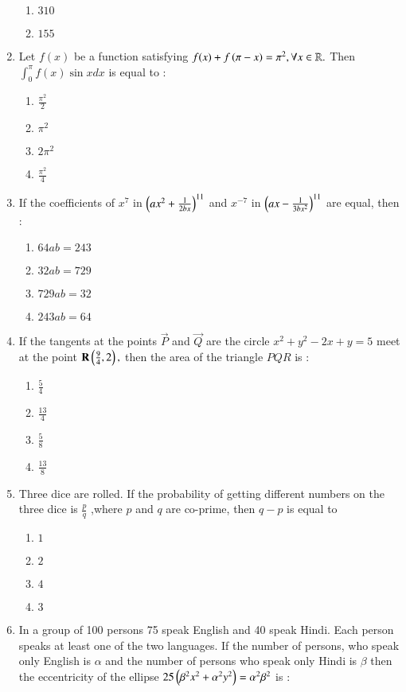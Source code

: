 \documentclass[journal,12pt,onecolumn]{IEEEtran}
\theoremstyle{remark}
\begin{document}
\begin{enumerate}
\begin{enumerate}
        \item $310$     
        \item $155$     
    \end{enumerate}
\item Let $f(x)$ be a function satisfying $f(x)+f\left(\pi -x\right)=\pi ^2,\forall x \in \mathbb{R}.$ Then $\int_0^{\pi} f(x) \sin x dx$ is equal to :
        \begin{enumerate}
        \item $\frac{\pi ^2}{2}$
        \item $\pi ^2$
        \item $2\pi ^2$
        \item $\frac{\pi ^2}{4}$
    \end{enumerate}
\item If the coefficients of $x^7$ in $\left( ax^2 + \frac{1}{2bx}\right)^{11}$ and $x^{-7}$ in $\left(ax - \frac{1}{3bx^2}\right)^{11}$ are equal, then :               
\begin{enumerate}
        \item $64 ab = 243$
        \item $32 ab = 729$
        \item $729 ab = 32$
        \item $243 ab = 64$
    \end{enumerate}
\item If the tangents at the points $\vec{P}$ and $\vec{Q}$ are the circle $ x^2 + y^2 -2x + y = 5 $ meet at the point $\mathbf{R} \left( \frac{9}{4},2\right) ,$ then the area of the triangle $PQR$ is :
\begin{enumerate}                  
        \item $\frac{5}{4}$    
        \item $\frac{13}{4}$
        \item $\frac{5}{8}$
        \item $\frac{13}{8}$
\end{enumerate}
\item Three dice are rolled. If the probability of getting different numbers on the three dice is
$\frac{p}{q}$ ,where $p$ and $q$ are co-prime, then $q-p$ is equal to 
        \begin{enumerate}
        \item $1$ 
        \item $2$
        \item $4$ 
        \item $3$
    \end{enumerate}
\item In a group of 100 persons 75 speak English and 40 speak Hindi. Each person speaks at least one of the two languages. If the number of persons, who speak only English is $\alpha$ and the number of persons who speak only Hindi is $\beta $ then the eccentricity of the ellipse $25 \left(\beta ^2 x^2 +\alpha ^2 y^2\right) = \alpha ^2 \beta ^2$ is :

\end{enumerate}
\end{document}
